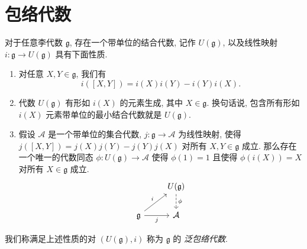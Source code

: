 \section{包络代数}

\begin{theorem}
  \label{tutorial-theorem-universal-enveloping-algebra}
  对于任意李代数 \( \mathfrak{g} \), 存在一个带单位的结合代数, 记作 \(
  U(\mathfrak{g}) \), 以及线性映射 \( i: \mathfrak{g} \to U(\mathfrak{g}) \)
  具有下面性质.
  \begin{enumerate}
    \item 对任意 \( X, Y \in \mathfrak{g} \), 我们有
      \[
        i([X, Y]) = i(X) i(Y) - i(Y) i(X).
      \]
    \item 代数 \( U(\mathfrak{g}) \) 有形如 \( i(X) \) 的元素生成, 其中 \( X \in
      \mathfrak{g} \). 换句话说, 包含所有形如 \( i(X) \)
      元素带单位的最小结合代数就是 \( U(\mathfrak{g}) \).
    \item 假设 \( \mathcal{A} \) 是一个带单位的集合代数, \( j: \mathfrak{g} \to
      \mathcal{A}\) 为线性映射, 使得 \( j([X, Y]) = j(X) j(Y) - j(Y) j(X) \)
      对所有 \( X, Y \in \mathfrak{g} \) 成立.
      那么存在一个唯一的代数同态 \( \phi: U(\mathfrak{g}) \to \mathcal{A} \)
      使得 \( \phi(1) = 1 \) 且使得 \( \phi(i(X)) = X \) 对所有 \( X \in
      \mathfrak{g} \) 成立.
      \[\begin{tikzcd}
        & {U(\mathfrak{g})} \\
        {\mathfrak{g}} & {\mathcal{A}}
        \arrow["\phi", dashed, from=1-2, to=2-2]
        \arrow["i", from=2-1, to=1-2]
        \arrow["j"', from=2-1, to=2-2]
      \end{tikzcd}\]
  \end{enumerate}
  我们称满足上述性质的对 \( (U(\mathfrak{g}), i) \) 称为 \( \mathfrak{g} \)
  的 \emph{泛包络代数}.
\end{theorem}
